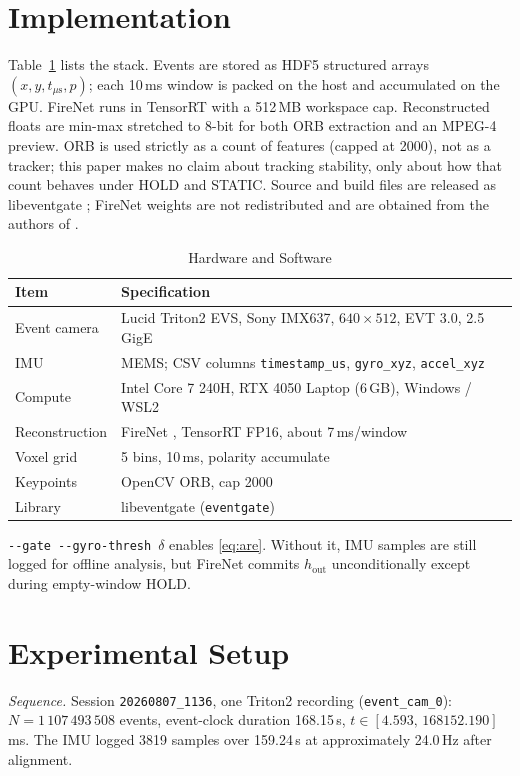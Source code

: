 \documentclass[journal]{IEEEtran}
\begin{document}
\section{Implementation}
\label{sec:impl}
Table~\ref{tab:hw} lists the stack. Events are stored as HDF5 structured arrays
\((x, y, t_{\mu\mathrm{s}}, p)\); each 10\,ms window is packed on the host and
accumulated on the GPU. FireNet runs in TensorRT with a 512\,MB workspace cap.
Reconstructed floats are min-max stretched to 8-bit for both ORB extraction and
an MPEG-4 preview. ORB is used strictly as a count of features (capped at 2000),
not as a tracker; this paper makes no claim about tracking stability, only about
how that count behaves under HOLD and STATIC. Source and build files are
released as libeventgate \cite{libeventgate}; FireNet weights are not
redistributed and are obtained from the authors of \cite{scheerlinck2020}.

\begin{table}[!t]
\caption{Hardware and Software}
\label{tab:hw}
\centering
\begin{tabularx}{\columnwidth}{@{}lX@{}}
\toprule
Item & Specification \\
\midrule
Event camera & Lucid Triton2 EVS, Sony IMX637, \(640\times 512\), EVT 3.0, 2.5 GigE \\
IMU & MEMS; CSV columns \texttt{timestamp\_us}, \texttt{gyro\_xyz}, \texttt{accel\_xyz} \\
Compute & Intel Core 7 240H, RTX 4050 Laptop (6\,GB), Windows / WSL2 \\
Reconstruction & FireNet \cite{scheerlinck2020}, TensorRT FP16, about 7\,ms/window \\
Voxel grid & 5 bins, 10\,ms, polarity accumulate \\
Keypoints & OpenCV ORB, cap 2000 \\
Library & libeventgate (\texttt{eventgate}) \cite{libeventgate} \\
\bottomrule
\end{tabularx}
\end{table}

\texttt{-{}-gate -{}-gyro-thresh}~$\delta$ enables \eqref{eq:are}. Without it,
IMU samples are still logged for offline analysis, but FireNet commits
\(h_{\mathrm{out}}\) unconditionally except during empty-window HOLD.

\section{Experimental Setup}
\label{sec:setup}
\textit{Sequence.} Session \texttt{20260807\_1136}, one Triton2 recording
(\texttt{event\_cam\_0}): \(N = 1\,107\,493\,508\) events, event-clock duration
168.15\,s, \(t \in [4.593,\, 168152.190]\)\,ms. The IMU logged 3819 samples over
159.24\,s at approximately 24.0\,Hz after alignment.
\end{document}
